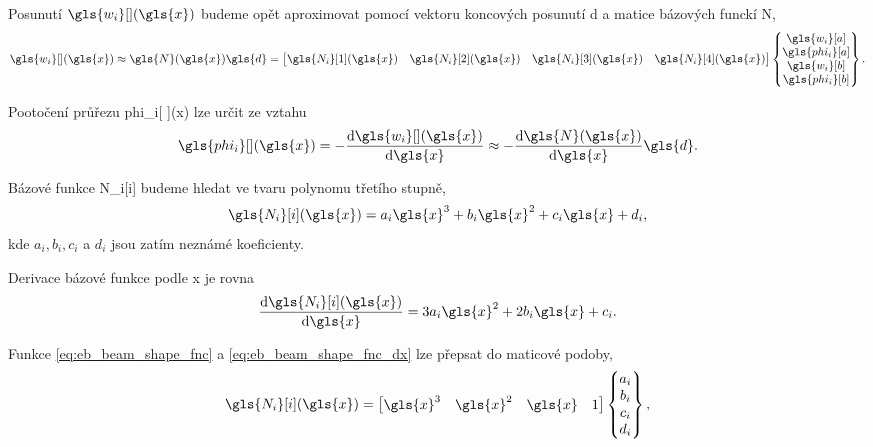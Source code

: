 Posunutí $\gls{w_i}[ ](\gls{x})$ budeme opět aproximovat pomocí vektoru koncových posunutí \gls{d} a matice bázových funckí \gls{N},
\begin{equation}
    \label{eq:deformation_approximation}
    \gls{w_i}[ ](\gls{x}) \approx \gls{N}(\gls{x}) \gls{d} = 
    \begin{bmatrix}
        \gls{N_i}[1](\gls{x}) &
        \gls{N_i}[2](\gls{x}) & 
        \gls{N_i}[3](\gls{x}) & 
        \gls{N_i}[4](\gls{x}) 
    \end{bmatrix}
    \begin{Bmatrix}
        \gls{w_i}[a] \\
        \gls{phi_i}[a] \\
        \gls{w_i}[b] \\
        \gls{phi_i}[b] \\
    \end{Bmatrix}.
\end{equation}

Pootočení průřezu \gls{phi_i}[ ](\gls{x}) lze určit ze vztahu
\begin{equation}
    \label{eq:rotation_approximation}
    \gls{phi_i}[ ](\gls{x}) = - \dv{\gls{w_i}[ ](\gls{x})}{\gls{x}} \approx - \dv{\gls{N}(\gls{x})}{\gls{x}} \gls{d}.
\end{equation}

Bázové funkce \gls{N_i}[i] budeme hledat ve tvaru polynomu třetího stupně,
\begin{equation}
    \label{eq:eb_beam_shape_fnc}
    \gls{N_i}[i](\gls{x}) = a_{i} \gls{x}^{3} + b_{i} \gls{x}^{2} + c_{i} \gls{x} + d_{i},
\end{equation}
kde $a_i, b_i, c_i$ a $d_i$ jsou zatím neznámé koeficienty.

Derivace bázové funkce podle \gls{x} je rovna
\begin{equation}
    \label{eq:eb_beam_shape_fnc_dx}
    \dv{\gls{N_i}[i](\gls{x})}{\gls{x}} = 3 a_{i} \gls{x}^{2} + 2 b_{i} \gls{x} + c_{i}.
\end{equation}


Funkce \ref{eq:eb_beam_shape_fnc} a \ref{eq:eb_beam_shape_fnc_dx} lze přepsat do maticové podoby,
\begin{equation}
    \label{eq:shape_function_coefficients_vector}
    \gls{N_i}[i](\gls{x}) = 
    \begin{bmatrix}
        \gls{x}^3 &
        \gls{x}^2 &
        \gls{x} &
        1
    \end{bmatrix}
    \begin{Bmatrix}
        a_i \\
        b_i \\
        c_i \\
        d_i \\
    \end{Bmatrix},
\end{equation}

